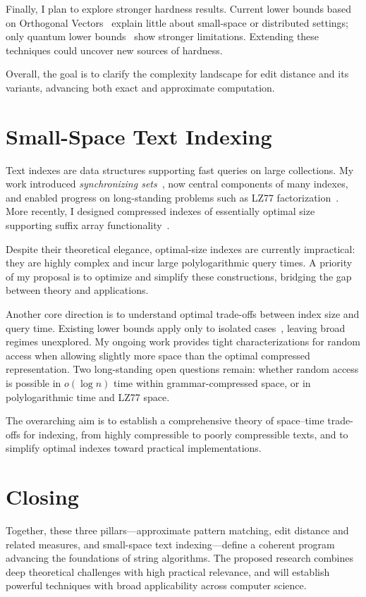 \documentclass[a4paper,11pt]{article}
\begin{document}
Finally, I plan to explore stronger hardness results. 
Current lower bounds based on Orthogonal Vectors~\cite{BI18} explain little about small-space or distributed settings; 
only quantum lower bounds~\cite{BPS21} show stronger limitations. 
Extending these techniques could uncover new sources of hardness.  

Overall, the goal is to clarify the complexity landscape for edit distance and its variants, advancing both exact and approximate computation.

\section{Small-Space Text Indexing}

Text indexes are data structures supporting fast queries on large collections. 
My work introduced \emph{synchronizing sets}~\cite{KK19}, now central components of many indexes, and enabled progress on long-standing problems such as LZ77 factorization~\cite{KK24}. 
More recently, I designed compressed indexes of essentially optimal size supporting suffix array functionality~\cite{KK23}.  

Despite their theoretical elegance, optimal-size indexes are currently impractical: they are highly complex and incur large polylogarithmic query times. 
A priority of my proposal is to optimize and simplify these constructions, bridging the gap between theory and applications.  

Another core direction is to understand optimal trade-offs between index size and query time. 
Existing lower bounds apply only to isolated cases~\cite{VY13}, leaving broad regimes unexplored. 
My ongoing work provides tight characterizations for random access when allowing slightly more space than the optimal compressed representation. 
Two long-standing open questions remain: whether random access is possible in $o(\log n)$ time within grammar-compressed space, or in polylogarithmic time and LZ77 space.  

The overarching aim is to establish a comprehensive theory of space--time trade-offs for indexing, from highly compressible to poorly compressible texts, and to simplify optimal indexes toward practical implementations.

\section*{Closing}

Together, these three pillars---approximate pattern matching, edit distance and related measures, and small-space text indexing---define a coherent program advancing the foundations of string algorithms. 
The proposed research combines deep theoretical challenges with high practical relevance, and will establish powerful techniques with broad applicability across computer science.
\end{document}

